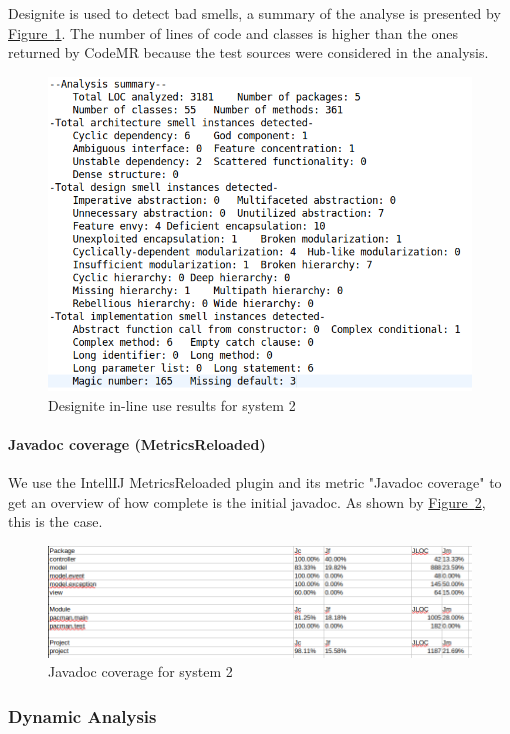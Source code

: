 \documentclass[]{article}
\newcommand{\wordlink}[2]{\hyperref[#2]{#1~\ref{#2}}}
\begin{document}
\vspace{0.1cm}

\newpage

Designite is used to detect bad smells, a summary of the analyse is presented by \wordlink{Figure}{fig:S2_designite}. The number of lines of code and classes is higher than the ones returned by CodeMR because the test sources were considered in the analysis.

\begin{figure}[h]
\centering
\includegraphics[width=0.65\linewidth]{S2-designite}
\caption{Designite in-line use results for system 2}
\label{fig:S2_designite}
\end{figure}


\paragraph{Javadoc coverage (MetricsReloaded)}

We use the IntellIJ MetricsReloaded plugin and its metric "Javadoc coverage" to get an overview of how complete is the initial javadoc. As shown by \wordlink{Figure}{fig:S2_javadoc}, this is the case.

\vspace{0.2cm}

\begin{figure}[h]
\centering
\includegraphics[width=0.75\linewidth]{S2-javadoc}
\caption{Javadoc coverage for system 2}
\label{fig:S2_javadoc}
\end{figure}

\newpage

\subsubsection{Dynamic Analysis}
\end{document}
